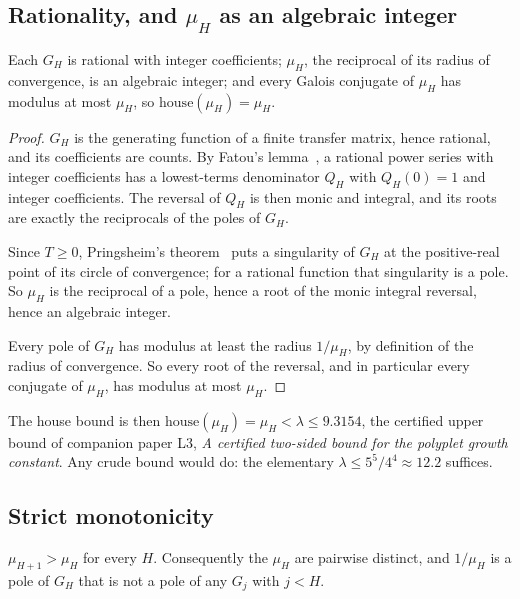 \documentclass[11pt]{article}
\begin{document}
\subsection{Rationality, and \texorpdfstring{$\mu_H$}{mu\_H} as an algebraic integer}

\begin{lemma}
\label{lem:alg}
Each $G_H$ is rational with integer coefficients; $\mu_H$, the reciprocal of its
radius of convergence, is an algebraic integer; and every Galois conjugate of
$\mu_H$ has modulus at most $\mu_H$, so $\mathrm{house}(\mu_H) = \mu_H$.
\end{lemma}

\begin{proof}
$G_H$ is the generating function of a finite transfer matrix, hence rational, and
its coefficients are counts. By Fatou's lemma~\cite{fatou1906}, a rational power
series with integer coefficients has a lowest-terms denominator $Q_H$ with
$Q_H(0) = 1$ and integer coefficients. The reversal of $Q_H$ is then monic and
integral, and its roots are exactly the reciprocals of the poles of $G_H$.

Since $T \ge 0$, Pringsheim's theorem~\cite[Thm.~IV.6]{flajoletSedgewick2009}
puts a singularity of $G_H$ at the positive-real point of its circle of
convergence; for a rational function that singularity is a pole. So $\mu_H$ is
the reciprocal of a pole, hence a root of the monic integral reversal, hence an
algebraic integer.

Every pole of $G_H$ has modulus at least the radius $1/\mu_H$, by definition of
the radius of convergence. So every root of the reversal, and in particular
every conjugate of $\mu_H$, has modulus at most $\mu_H$.
\end{proof}

The house bound is then $\mathrm{house}(\mu_H) = \mu_H < \lambda \le 9.3154$,
the certified upper bound of companion paper L3, \emph{A certified two-sided
bound for the polyplet growth constant}. Any crude bound would do: the
elementary $\lambda \le 5^5/4^4 \approx 12.2$ suffices.

\subsection{Strict monotonicity}

\begin{lemma}
\label{lem:mono}
$\mu_{H+1} > \mu_H$ for every $H$. Consequently the $\mu_H$ are pairwise
distinct, and $1/\mu_H$ is a pole of $G_H$ that is not a pole of any $G_j$ with
$j < H$.
\end{lemma}
\end{document}

